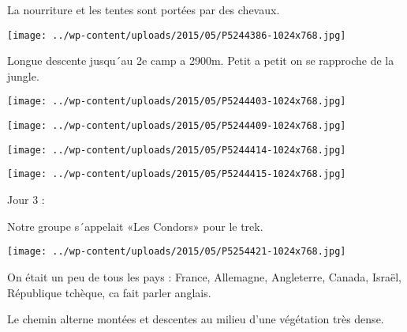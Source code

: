  

 La nourriture et les tentes sont portées par des chevaux. 

 

\begin{center} \texttt{[image: ../wp-content/uploads/2015/05/P5244386-1024x768.jpg]} \end{center}

 

 Longue descente jusqu´au 2e camp a 2900m. Petit a petit on se rapproche de la jungle. 

 

\begin{center} \texttt{[image: ../wp-content/uploads/2015/05/P5244403-1024x768.jpg]} \end{center}

 

 

\begin{center} \texttt{[image: ../wp-content/uploads/2015/05/P5244409-1024x768.jpg]} \end{center}

 

 

\begin{center} \texttt{[image: ../wp-content/uploads/2015/05/P5244414-1024x768.jpg]} \end{center}

 

 

\begin{center} \texttt{[image: ../wp-content/uploads/2015/05/P5244415-1024x768.jpg]} \end{center}

 

 Jour 3 : 

 Notre groupe s´appelait «Les Condors» pour le trek. 

 

\begin{center} \texttt{[image: ../wp-content/uploads/2015/05/P5254421-1024x768.jpg]} \end{center}

 

 On était un peu de tous les pays : France, Allemagne, Angleterre, Canada, Israël, République tchèque, ca fait parler anglais.

 Le chemin alterne montées et descentes au milieu d'une végétation très dense. 

